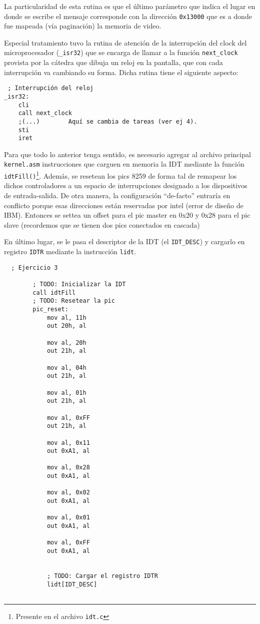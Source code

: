 La particularidad de esta rutina es que el último parámetro que indica el lugar en donde se escribe el mensaje corresponde con la dirección \texttt{0x13000} que es a donde fue mapeada (vía paginación) la memoria de video. %

Especial tratamiento tuvo la rutina de atención de la interrupción del clock del microprocesador (\texttt{\_isr32}) que se encarga de llamar a la función \texttt{next\_clock} provista por la cátedra que dibuja un reloj en la pantalla, que con cada interrupción va cambiando su forma. Dicha rutina tiene el siguiente aspecto:
\begin{verbatim}
 ; Interrupción del reloj
_isr32:    
    cli
    call next_clock
    ;(...)        Aquí se cambia de tareas (ver ej 4).
    sti  
    iret
\end{verbatim}

Para que todo lo anterior tenga sentido, es necesario agregar al archivo principal \texttt{kernel.asm} instrucciones que carguen en memoria la IDT mediante la función \texttt{idtFill()}\footnote{Presente en el archivo \texttt{idt.c}}. Además, se resetean los pics 8259 de forma tal de remapear los dichos controladores a un espacio de interrupciones designado a los dispositivos de entrada-salida. %
De otra manera, la configuración ``de-facto'' entraría en conflicto porque esas direcciones están reservadas por intel (error de diseño de IBM). Entonces se settea un offset para el pic master en 0x20 y 0x28 para el pic slave (recordemos que se tienen dos pics conectados en cascada) %

En último lugar, se le pasa el descriptor de la IDT (el \texttt{IDT\_DESC}) y cargarlo en registro \texttt{IDTR} mediante la instrucción \texttt{lidt}.

\begin{verbatim}
  ; Ejercicio 3
    
        ; TODO: Inicializar la IDT
        call idtFill
        ; TODO: Resetear la pic
        pic_reset:
            mov al, 11h
            out 20h, al

            mov al, 20h
            out 21h, al

            mov al, 04h
            out 21h, al

            mov al, 01h
            out 21h, al

            mov al, 0xFF
            out 21h, al

            mov al, 0x11
            out 0xA1, al

            mov al, 0x28
            out 0xA1, al

            mov al, 0x02
            out 0xA1, al

            mov al, 0x01
            out 0xA1, al

            mov al, 0xFF
            out 0xA1, al
       

            ; TODO: Cargar el registro IDTR
            lidt[IDT_DESC]
           
\end{verbatim}


